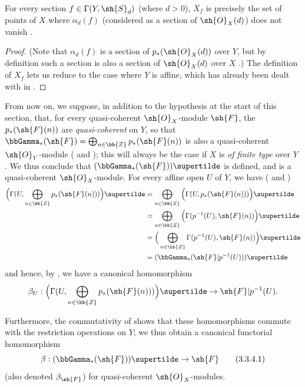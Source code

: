 \begin{proposition}[3.3.3]
\label{II.3.3.3}
For every section $f\in\Gamma(Y,\sh{S}_d)$ (where $d>0$), $X_f$ is precisely the set of points of $X$ where $\alpha_d(f)$ (considered as a section of $\sh{O}_X(d)$) does not vanish .
\end{proposition}

\begin{proof}
(Note that $\alpha_d(f)$ is a section of $p_*(\sh{O}_X(d))$ over $Y$, but by definition such a section is also a section of $\sh{O}_X(d)$ over $X$ .)
The definition of $X_f$  lets us reduce to the case where $Y$ is affine, which has already been dealt with in .
\end{proof}

\begin{env}[3.3.4]
\label{II.3.3.4}
From now on, we suppose, in addition to the hypothesis at the start of this section, that, for every quasi-coherent $\sh{O}_X$-module $\sh{F}$, the $p_*(\sh{F}(n))$ are \emph{quasi-coherent} on $Y$, so that $\bbGamma_*(\sh{F})=\bigoplus_{n\in\bb{Z}}p_*(\sh{F}(n))$ is also a quasi-coherent $\sh{O}_Y$-module ( and );
this will always be the case if $X$ is \emph{of finite type} over $Y$ .
We thus conclude that $(\bbGamma_*(\sh{F}))\supertilde$ is defined, and is a quasi-coherent $\sh{O}_X$-module.
For every affine open $U$ of $Y$, we have ( and )
\begin{align*}
  \Big( \Gamma(U,\bigoplus_{n\in\bb{Z}}p_*(\sh{F}(n))) \Big)\supertilde
  &= \bigoplus_{n\in\bb{Z}}\Big( \Gamma(U,p_*(\sh{F}(n))) \Big)\supertilde
\\&= \bigoplus_{n\in\bb{Z}}\Big( \Gamma(p^{-1}(U),\sh{F}(n)) \Big)\supertilde
\\&= \Big( \bigoplus_{n\in\bb{Z}}\Gamma(p^{-1}(U),\sh{F}(n)) \Big)\supertilde
\\&= (\bbGamma_*(\sh{F}|p^{-1}(U)))\supertilde
\end{align*}
and hence, by , we have a canonical homomorphism
\[
  \beta_U : \Big( \Gamma(U,\bigoplus_{n\in\bb{Z}}p_*(\sh{F}(n))) \Big)\supertilde \to \sh{F}|p^{-1}(U).
\]

Furthermore, the commutativity of  shows that these homomorphisms commute with the restriction operations on $Y$;
we thus obtain a canonical functorial homomorphism
\[
\label{II.3.3.4.1}
  \beta : (\bbGamma_*(\sh{F}))\supertilde \to \sh{F}
\tag{3.3.4.1}
\]
(also denoted $\beta_{\sh{F}}$) for quasi-coherent $\sh{O}_X$-modules.
\end{env}

